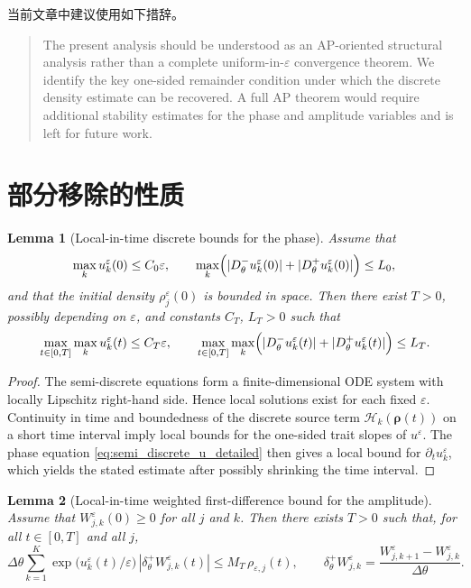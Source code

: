 \documentclass[11pt,a4paper]{ctexart}
\newtheorem{lemma}{Lemma}[section]
\begin{document}
当前文章中建议使用如下措辞。

\begin{quote}
The present analysis should be understood as an AP-oriented structural
analysis rather than a complete uniform-in-\(\varepsilon\) convergence
theorem. We identify the key one-sided remainder condition under which the
discrete density estimate can be recovered. A full AP theorem would require
additional stability estimates for the phase and amplitude variables and is
left for future work.
\end{quote}




\section{部分移除的性质}
\begin{lemma}[Local-in-time discrete bounds for the phase]\label{lem:slope_u}
Assume that
\[
\max_k u_k^\varepsilon(0)\le C_0\varepsilon,
\qquad
\max_k\Bigl(|D_\theta^-u_k^\varepsilon(0)|+|D_\theta^+u_k^\varepsilon(0)|\Bigr)\le L_0,
\]
and that the initial density \(\rho_j^\varepsilon(0)\) is bounded in space. Then there exist \(T>0\), possibly depending on \(\varepsilon\), and constants \(C_T\), \(L_T>0\) such that
\[
\max_{t\in[0,T]}\max_k u_k^\varepsilon(t)\le C_T\varepsilon,
\qquad
\max_{t\in[0,T]}\max_k\Bigl(|D_\theta^-u_k^\varepsilon(t)|+|D_\theta^+u_k^\varepsilon(t)|\Bigr)\le L_T.
\]
\end{lemma}

\begin{proof}
The semi-discrete equations form a finite-dimensional ODE system with locally Lipschitz right-hand side. Hence local solutions exist for each fixed \(\varepsilon\). Continuity in time and boundedness of the discrete source term \(\mathcal H_k(\boldsymbol\rho(t))\) on a short time interval imply local bounds for the one-sided trait slopes of \(u^\varepsilon\). The phase equation \eqref{eq:semi_discrete_u_detailed} then gives a local bound for \(\partial_t u_k^\varepsilon\), which yields the stated estimate after possibly shrinking the time interval.
\end{proof}

\begin{lemma}[Local-in-time weighted first-difference bound for the amplitude]\label{lem:W_diff}
Assume that \(W_{j,k}^\varepsilon(0)\ge0\) for all \(j\) and \(k\). Then there exists \(T>0\) such that, for all \(t\in[0,T]\) and all \(j\),
\begin{equation}\label{eq:weighted_first_diff_W_simple}
\Delta\theta\sum_{k=1}^K
\exp\!\bigl(u_k^\varepsilon(t)/\varepsilon\bigr)\,|\delta_\theta^+ W_{j,k}^\varepsilon(t)|
\le
M_T\,\rho_{\varepsilon,j}(t),
\qquad
\delta_\theta^+W_{j,k}^\varepsilon=
\frac{W_{j,k+1}^\varepsilon-W_{j,k}^\varepsilon}{\Delta\theta}.
\end{equation}
\end{lemma}
\end{document}
